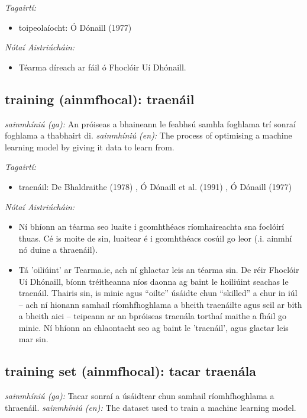 \documentclass{article}
\begin{document}
 \noindent \textit{Tagairtí:}
\begin{itemize}
	\item toipeolaíocht: Ó Dónaill (1977) \cite{odonaill}
\end{itemize}

 \noindent \textit{Nótaí Aistriúcháin:}
\begin{itemize}
	\item Téarma díreach ar fáil ó Fhoclóir Uí Dhónaill.
\end{itemize}


\subsection*{training (ainmfhocal): traenáil} 
 \noindent \textit{sainmhíniú (ga):} An próiseas a bhaineann le feabhsú samhla foghlama trí sonraí foghlama a thabhairt di.
\newline\newline
 \noindent \textit{sainmhíniú (en):} The process of optimising a machine learning model by giving it data to learn from.
\newline

 \noindent \textit{Tagairtí:}
\begin{itemize}
	\item traenáil: De Bhaldraithe (1978) \cite{de-bhaldraithe}, Ó Dónaill et al. (1991) \cite{focloir-beag}, Ó Dónaill (1977) \cite{odonaill}
\end{itemize}

 \noindent \textit{Nótaí Aistriúcháin:}
\begin{itemize}
	\item Ní bhíonn an téarma seo luaite i gcomhthéacs ríomhaireachta sna foclóirí thuas. Cé is moite de sin, luaitear é i gcomhthéacs cosúil go leor (.i. ainmhí nó duine a thraenáil).
	\item Tá 'oiliúint' ar Tearma.ie, ach ní ghlactar leis an téarma sin. De réir Fhoclóir Uí Dhónaill, bíonn tréitheanna níos daonna ag baint le hoiliúint seachas le traenáil. Thairis sin, is minic agus “oilte” úsáidte chun “skilled” a chur in iúl -- ach ní hionann samhail ríomhfhoghlama a bheith traenáilte agus scil ar bith a bheith aici -- teipeann ar an bpróiseas traenála torthaí maithe a fháil go minic. Ní bhíonn an chlaontacht seo ag baint le 'traenáil', agus glactar leis mar sin.
\end{itemize}


\subsection*{training set (ainmfhocal): tacar traenála} 
 \noindent \textit{sainmhíniú (ga):} Tacar sonraí a úsáidtear chun samhail ríomhfhoghlama a thraenáil.
\newline\newline
 \noindent \textit{sainmhíniú (en):} The dataset used to train a machine learning model.
\newline
\end{document}
